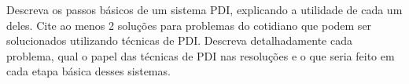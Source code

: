 \documentclass[12pt,a4paper]{article}
\begin{document}
\begin{question}{1}
Descreva os passos básicos de um sistema PDI, explicando a utilidade de cada um
deles. Cite ao menos 2 soluções para problemas do cotidiano que podem ser
solucionados utilizando técnicas de PDI. Descreva detalhadamente cada problema,
qual o papel das técnicas de PDI nas resoluções e o que seria feito em cada
etapa básica desses sistemas.
\end{question}


\pagebreak
\medskip
\printbibliography[
    heading=bibintoc,
    title={Referências Bibliográficas}
]
\end{document}
